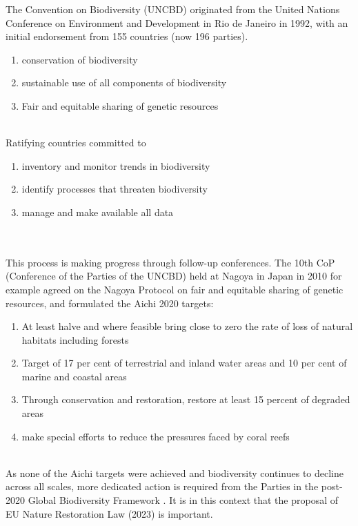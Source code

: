 \documentclass[../summary.tex]{subfiles}
\begin{document}
The Convention on Biodiversity (UNCBD) originated from the United Nations Conference on Environment and Development in Rio de Janeiro in 1992, with an initial endorsement from 155 countries (now 196 parties). 
\begin{enumerate}[nolistsep]
	\item conservation of biodiversity
	\item sustainable use of all components of biodiversity
	\item Fair and equitable sharing of genetic resources
\end{enumerate}
\ \\
Ratifying countries committed to
\begin{enumerate}[nolistsep]
	\item inventory and monitor trends in biodiversity
	\item identify processes that threaten biodiversity
	\item manage and make available all data
\end{enumerate}
 \ \\
 \\
This process is making progress through follow-up conferences. The 10th CoP (Conference of the Parties of the UNCBD) held at Nagoya in Japan in 2010 for example agreed on the Nagoya Protocol on fair and equitable sharing of genetic resources, and formulated the Aichi 2020 targets:
\begin{enumerate}[nolistsep]
	\item At least halve and where feasible bring close to zero the rate of loss of natural habitats including forests
	\item Target of 17 per cent of terrestrial and inland water areas and 10 per cent of marine and coastal areas
	\item Through conservation and restoration, restore at least 15 percent of degraded areas
	\item make special efforts to reduce the pressures faced by coral reefs
\end{enumerate}
\ \\
As none of the Aichi targets were achieved and biodiversity continues to decline across all scales, more dedicated action is required from the Parties in the post-2020 Global Biodiversity Framework . It is in this context that the proposal of EU Nature Restoration Law (2023) is important.  
\end{document}
